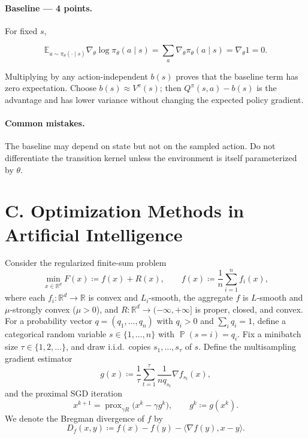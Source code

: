 \documentclass[11pt,a4paper]{article}
\DeclareMathOperator{\Pbb}{\mathbb{P}}
\DeclareMathOperator{\prox}{prox}
\begin{document}
\paragraph{Baseline --- 4 points.}

For fixed $s$,

\[
\mathbb{E}_{a\sim\pi_\theta(\cdot\mid s)}
\nabla_\theta\log\pi_\theta(a\mid s)
=\sum_a\nabla_\theta\pi_\theta(a\mid s)
=\nabla_\theta 1=0.
\]

Multiplying by any action-independent $b(s)$ proves that the baseline term has zero expectation. Choose $b(s)\approx V^\pi(s)$; then $Q^\pi(s,a)-b(s)$ is the advantage and has lower variance without changing the expected policy gradient.

\paragraph{Common mistakes.}

The baseline may depend on state but not on the sampled action. Do not differentiate the transition kernel unless the environment is itself parameterized by $\theta$.



\section{C. Optimization Methods in Artificial Intelligence}

Consider the regularized finite-sum problem
\[
\min_{x \in \mathbb{R}^{d}} F(x) \coloneqq f(x) + R(x), \qquad f(x) \coloneqq \frac{1}{n} \sum_{i=1}^{n} f_i(x),
\]
where each $f_i : \mathbb{R}^{d} \to \mathbb{R}$ is convex and $L_i$-smooth, the aggregate $f$ is $L$-smooth and $\mu$-strongly convex ($\mu > 0$), and $R : \mathbb{R}^{d} \to (-\infty, +\infty]$ is proper, closed, and convex. For a probability vector $q = (q_1, \dots, q_n)$ with $q_i > 0$ and $\sum_i q_i = 1$, define a categorical random variable $s \in \{1, \dots, n\}$ with $\Pbb(s = i) = q_i$. Fix a minibatch size $\tau \in \{1, 2, \dots\}$, and draw i.i.d.\ copies $s_1, \dots, s_{\tau}$ of $s$. Define the multisampling gradient estimator
\[
g(x) \coloneqq \frac{1}{\tau} \sum_{t=1}^{\tau} \frac{1}{n q_{s_t}} \nabla f_{s_t}(x),
\]
and the proximal SGD iteration
\[
x^{k+1} = \prox_{\gamma R}\bigl(x^{k} - \gamma g^{k}\bigr), \qquad g^{k} \coloneqq g(x^{k}).
\]
We denote the Bregman divergence of $f$ by
\[
D_f(x, y) \coloneqq f(x) - f(y) - \langle \nabla f(y), x - y \rangle.
\]
\end{document}
